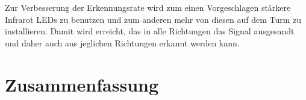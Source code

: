 \documentclass[12pt,a4paper,titlepage]{article}
\begin{document}
Zur Verbesserung der Erkennungsrate wird zum einen Vorgeschlagen stärkere Infrarot LEDs zu benutzen und zum anderen mehr von diesen auf dem Turm zu installieren. Damit wird erreicht, das in alle Richtungen das Signal ausgesandt und daher auch aus jeglichen Richtungen erkannt werden kann.

\section{Zusammenfassung}




%
%




\end{document}
